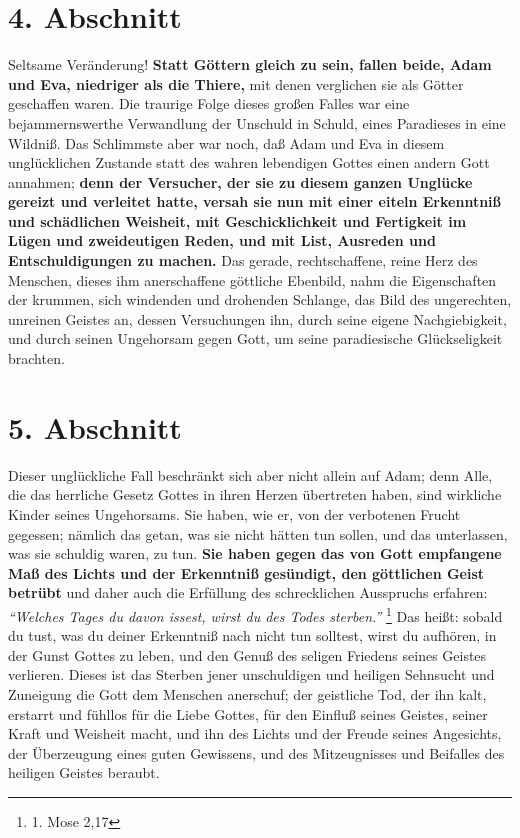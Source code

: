\section{4. Abschnitt} \label{kap7_ab4}

Seltsame Veränderung! \textbf{Statt Göttern gleich zu sein, fallen beide, Adam und Eva, 
niedriger als die Thiere,} mit denen verglichen sie als Götter geschaffen waren.
Die traurige Folge dieses großen Falles war eine bejammernswerthe Verwandlung
der Unschuld in Schuld, eines Paradieses in eine Wildniß. Das Schlimmste aber
war noch, daß Adam und Eva in diesem unglücklichen Zustande statt des wahren
lebendigen Gottes einen andern Gott annahmen; \textbf{denn der Versucher, der sie zu
diesem ganzen Unglücke gereizt und verleitet hatte, versah sie nun mit einer
eiteln Erkenntniß und schädlichen Weisheit, mit Geschicklichkeit und Fertigkeit
im Lügen und zweideutigen Reden, und mit List, Ausreden und Entschuldigungen zu
machen.} Das gerade, rechtschaffene, reine Herz des Menschen, dieses ihm
anerschaffene göttliche Ebenbild, nahm die Eigenschaften der krummen, sich
windenden und drohenden Schlange, das Bild des ungerechten, unreinen Geistes an,
dessen Versuchungen ihn, durch seine eigene Nachgiebigkeit, und durch seinen
Ungehorsam gegen Gott, um seine paradiesische Glückseligkeit brachten.

\section{5. Abschnitt} \label{kap7_ab5}

Dieser unglückliche Fall beschränkt sich aber nicht allein auf Adam; denn Alle,
die das herrliche Gesetz Gottes in ihren Herzen übertreten haben, sind wirkliche
Kinder seines Ungehorsams. Sie haben, wie er, von der verbotenen Frucht
gegessen; nämlich das getan, was sie nicht hätten tun sollen, und das
unterlassen, was sie schuldig waren, zu tun. \textbf{Sie haben gegen das von Gott
empfangene Maß des Lichts und der Erkenntniß gesündigt, den göttlichen Geist
betrübt} und daher auch die Erfüllung des schrecklichen Ausspruchs erfahren:
\textit{"`Welches Tages du davon issest, wirst du des Todes sterben."'}
\footnote{1. Mose 2,17}
Das heißt: sobald du tust, was du deiner Erkenntniß nach nicht tun
solltest, wirst du aufhören, in der Gunst Gottes zu leben, und den Genuß des
seligen Friedens seines Geistes verlieren. Dieses ist das Sterben jener
unschuldigen und heiligen Sehnsucht und Zuneigung die Gott dem Menschen
anerschuf; der geistliche Tod, der ihn kalt, erstarrt und fühllos für die Liebe
Gottes, für den Einfluß seines Geistes, seiner Kraft und Weisheit macht, und ihn
des Lichts und der Freude seines Angesichts, der Überzeugung eines guten
Gewissens, und des Mitzeugnisses und Beifalles des heiligen Geistes beraubt.

